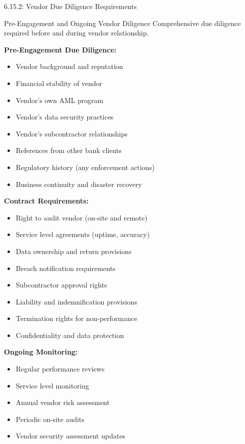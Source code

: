 \documentclass[11pt,a4paper]{beamer}
\begin{document}
\begin{frame}{6.15.2: Vendor Due Diligence Requirements}
	\begin{block}{Pre-Engagement and Ongoing Vendor Diligence}
		Comprehensive due diligence required before and during vendor relationship.
	\end{block}
	\textbf{Pre-Engagement Due Diligence:}
	\begin{itemize}
		\item Vendor background and reputation
		\item Financial stability of vendor
		\item Vendor's own AML program
		\item Vendor's data security practices
		\item Vendor's subcontractor relationships
		\item References from other bank clients
		\item Regulatory history (any enforcement actions)
		\item Business continuity and disaster recovery
	\end{itemize}
	\textbf{Contract Requirements:}
	\begin{itemize}
		\item Right to audit vendor (on-site and remote)
		\item Service level agreements (uptime, accuracy)
		\item Data ownership and return provisions
		\item Breach notification requirements
		\item Subcontractor approval rights
		\item Liability and indemnification provisions
		\item Termination rights for non-performance
		\item Confidentiality and data protection
	\end{itemize}
	\textbf{Ongoing Monitoring:}
	\begin{itemize}
		\item Regular performance reviews
		\item Service level monitoring
		\item Annual vendor risk assessment
		\item Periodic on-site audits
		\item Vendor security assessment updates
	\end{itemize}
\end{frame}

\end{document}

